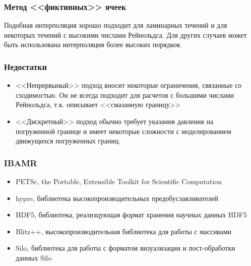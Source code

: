 \documentclass[14pt]{beamer}
\begin{document}
\begin{frame}
\frametitle{Метод <<фиктивных>> ячеек}
Подобная интерполяция хорошо подходит для ламинарных течений и для некоторых течений с высокими числами Рейнольдса.
Для других случаев может быть использована интерполяция более высоких порядков. 
\end{frame}

\begin{frame}
\frametitle{Недостатки}
    \begin{itemize}
        \item \alert<+>{<<Непрервыный>> подход вносит некоторые ограничения, связанные со сходимостью. Он не всегда подходит для расчетов с большими числами Рейнольдса, т.к. описывает <<смазанную границу>>
}
        \item \alert<+>{<<Дискретный>> подход обычно требует указания давления на погруженной границе и имеет некоторые сложности с моделированием движущихся погруженных границ.}
    \end{itemize}
\end{frame}

\begin{frame}
\frametitle{IBAMR}
    \begin{itemize}
        \item \alert<+>{PETSc, the Portable, Extensible Toolkit for Scientific Computation}
        \item \alert<+>{hypre, библиотека высокопроизводительных предобуславливателей}
        \item \alert<+>{HDF5, библиотека, реализцующая формат хранения научных данных HDF5}
        \item \alert<+>{Blitz++, высокопроизводительная библиотека для работы с массивами}
        \item \alert<+>{Silo, библиотека для работы с форматом визуализации и пост-обработки данных Silo}
    \end{itemize}
\end{frame}
\end{document}
